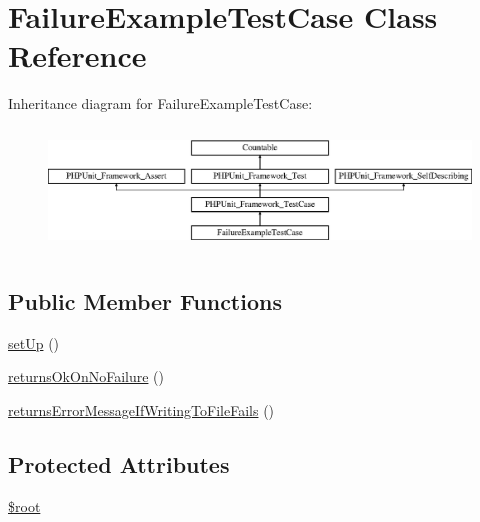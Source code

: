\hypertarget{classorg_1_1bovigo_1_1vfs_1_1example_1_1_failure_example_test_case}{}\section{Failure\+Example\+Test\+Case Class Reference}
\label{classorg_1_1bovigo_1_1vfs_1_1example_1_1_failure_example_test_case}
Inheritance diagram for Failure\+Example\+Test\+Case\+:\begin{figure}[H]
\begin{center}
\leavevmode
\includegraphics[height=3.303835cm]{classorg_1_1bovigo_1_1vfs_1_1example_1_1_failure_example_test_case}
\end{center}
\end{figure}
\subsection*{Public Member Functions}
\begin{DoxyCompactItemize}
\item 
\mbox{\hyperlink{classorg_1_1bovigo_1_1vfs_1_1example_1_1_failure_example_test_case_a0bc688732d2b3b162ffebaf7812e78da}{set\+Up}} ()
\item 
\mbox{\hyperlink{classorg_1_1bovigo_1_1vfs_1_1example_1_1_failure_example_test_case_a1f6d994c1e91f317cf091eb73c68c7fe}{returns\+Ok\+On\+No\+Failure}} ()
\item 
\mbox{\hyperlink{classorg_1_1bovigo_1_1vfs_1_1example_1_1_failure_example_test_case_a6b9a5d5df69d4747e205aa4c4ddd9f26}{returns\+Error\+Message\+If\+Writing\+To\+File\+Fails}} ()
\end{DoxyCompactItemize}
\subsection*{Protected Attributes}
\begin{DoxyCompactItemize}
\item 
\mbox{\hyperlink{classorg_1_1bovigo_1_1vfs_1_1example_1_1_failure_example_test_case_ab37f7c32f41c3c61ed940887453767f4}{\$root}}
\end{DoxyCompactItemize}
